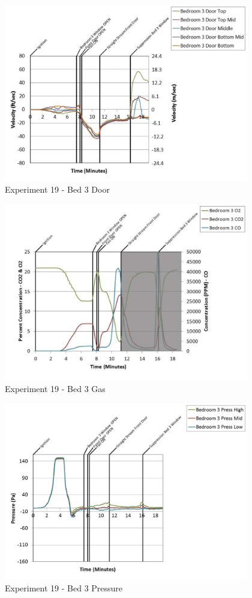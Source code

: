 \documentclass{article}
\begin{document}
\begin{appendices}
	\begin{figure}[h!]
		\centering
		\includegraphics[height=3.05in]{0_Images/Results_Charts/Exp_19_Charts/Bed3Door.pdf}
		\caption{Experiment 19 - Bed 3 Door}
	\end{figure}
 
	\clearpage

	\begin{figure}[h!]
		\centering
		\includegraphics[height=3.05in]{0_Images/Results_Charts/Exp_19_Charts/Bed3Gas.pdf}
		\caption{Experiment 19 - Bed 3 Gas}
	\end{figure}
 

	\begin{figure}[h!]
		\centering
		\includegraphics[height=3.05in]{0_Images/Results_Charts/Exp_19_Charts/Bed3Pressure.pdf}
		\caption{Experiment 19 - Bed 3 Pressure}
	\end{figure}
 

\end{appendices}
\end{document}
